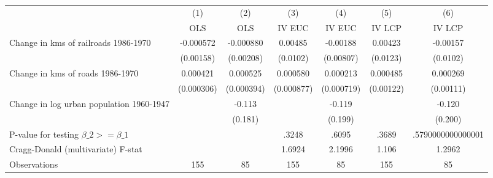 {
\def\sym#1{\ifmmode^{#1}\else\(^{#1}\)\fi}
\begin{tabular}{l*{6}{c}}
\hline\hline
                &\multicolumn{1}{c}{(1)}&\multicolumn{1}{c}{(2)}&\multicolumn{1}{c}{(3)}&\multicolumn{1}{c}{(4)}&\multicolumn{1}{c}{(5)}&\multicolumn{1}{c}{(6)}\\
                &\multicolumn{1}{c}{OLS}&\multicolumn{1}{c}{OLS}&\multicolumn{1}{c}{IV EUC}&\multicolumn{1}{c}{IV EUC}&\multicolumn{1}{c}{IV LCP}&\multicolumn{1}{c}{IV LCP}\\
\hline
Change in kms of railroads 1986-1970&-0.000572         &-0.000880         &  0.00485         & -0.00188         &  0.00423         & -0.00157         \\
                &(0.00158)         &(0.00208)         & (0.0102)         &(0.00807)         & (0.0123)         & (0.0102)         \\
[1em]
Change in kms of roads 1986-1970& 0.000421         & 0.000525         & 0.000580         & 0.000213         & 0.000485         & 0.000269         \\
                &(0.000306)         &(0.000394)         &(0.000877)         &(0.000719)         &(0.00122)         &(0.00111)         \\
[1em]
Change in log urban population 1960-1947&                  &   -0.113         &                  &   -0.119         &                  &   -0.120         \\
                &                  &  (0.181)         &                  &  (0.199)         &                  &  (0.200)         \\
\hline
P-value for testing $\beta\_{2} >= \beta\_{1}$&                  &                  &    .3248         &    .6095         &    .3689         &.5790000000000001         \\
Cragg-Donald (multivariate) F-stat&                  &                  &   1.6924         &   2.1996         &    1.106         &   1.2962         \\
Observations    &      155         &       85         &      155         &       85         &      155         &       85         \\
\hline\hline
\end{tabular}
}

